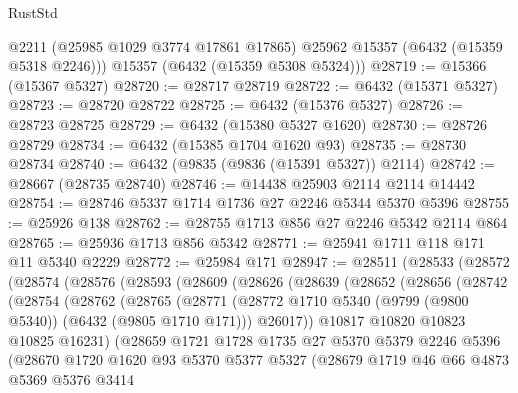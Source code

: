 \begin{lexlean}{RustStd}
\begin{coremodule}
        @2211
        (@25985 @1029 @3774 @17861 @17865)
        @25962
        @15357
        (@6432 (@15359 @5318 @2246)))
      @15357
      (@6432 (@15359 @5308 @5324)))
@28719 := @15366 (@15367 @5327)
@28720 := @28717 @28719
@28722 := @6432 (@15371 @5327)
@28723 := @28720 @28722
@28725 := @6432 (@15376 @5327)
@28726 := @28723 @28725
@28729 := @6432 (@15380 @5327 @1620)
@28730 := @28726 @28729
@28734 := @6432 (@15385 @1704 @1620 @93)
@28735 := @28730 @28734
@28740 := @6432 (@9835 (@9836 (@15391 @5327)) @2114)
@28742 := @28667 (@28735 @28740)
@28746 := @14438 @25903 @2114 @2114 @14442
@28754 := @28746 @5337 @1714 @1736 @27 @2246 @5344 @5370 @5396
@28755 := @25926 @138
@28762 := @28755 @1713 @856 @27 @2246 @5342 @2114 @864
@28765 := @25936 @1713 @856 @5342
@28771 := @25941 @1711 @118 @171 @11 @5340 @2229
@28772 := @25984 @171
@28947 := @28511
    (@28533
      (@28572
        (@28574
          (@28576
            (@28593
              (@28609
                (@28626
                  (@28639
                    (@28652
                      (@28656
                        (@28742
                          (@28754
                            (@28762
                              (@28765
                                (@28771
                                  (@28772
                                    @1710
                                    @5340
                                    (@9799 (@9800 @5340))
                                    (@6432 (@9805 @1710 @171)))
                                  @26017))
                              @10817
                              @10820
                              @10823
                              @10825
                              @16231)
                            (@28659
                              @1721
                              @1728
                              @1735
                              @27
                              @5370
                              @5379
                              @2246
                              @5396
                              (@28670
                                @1720
                                @1620
                                @93
                                @5370
                                @5377
                                @5327
                                (@28679
                                  @1719
                                  @46
                                  @66
                                  @4873
                                  @5369
                                  @5376
                                  @3414

\end{coremodule}
\end{lexlean}
